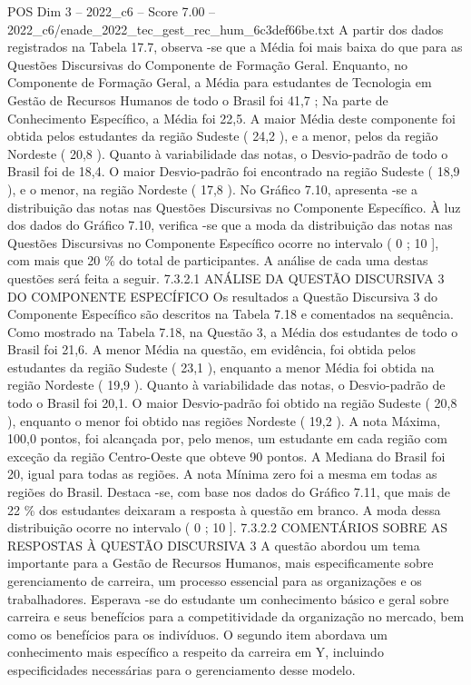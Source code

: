 \begin{textsample}{POS Dim 3 – 2022\_c6 – Score 7.00 – 2022\_c6/enade\_2022\_tec\_gest\_rec\_hum\_6c3def66be.txt}
A partir dos dados registrados na Tabela 17.7, observa -se que a Média foi mais baixa do que para as Questões Discursivas do Componente de Formação Geral.
Enquanto, no Componente de Formação Geral, a Média para estudantes de Tecnologia em Gestão de Recursos Humanos de todo o Brasil foi 41,7 ; Na parte de Conhecimento Específico, a Média foi 22,5.
A maior Média deste componente foi obtida pelos estudantes da região Sudeste ( 24,2 ), e a menor, pelos da região Nordeste ( 20,8 ).
Quanto à variabilidade das notas, o Desvio-padrão de todo o Brasil foi de 18,4.
O maior Desvio-padrão foi encontrado na região Sudeste ( 18,9 ), e o menor, na região Nordeste ( 17,8 ).
No Gráfico 7.10, apresenta -se a distribuição das notas nas Questões Discursivas no Componente Específico.
À luz dos dados do Gráfico 7.10, verifica -se que a moda da distribuição das notas nas Questões Discursivas no Componente Específico ocorre no intervalo ( 0 ; 10 ], com mais que 20 \% do total de participantes.
A análise de cada uma destas questões será feita a seguir. 7.3.2.1 ANÁLISE DA QUESTÃO DISCURSIVA 3 DO COMPONENTE ESPECÍFICO Os resultados a Questão Discursiva 3 do Componente Específico são descritos na Tabela 7.18 e comentados na sequência.
Como mostrado na Tabela 7.18, na Questão 3, a Média dos estudantes de todo o Brasil foi 21,6.
A menor Média na questão, em evidência, foi obtida pelos estudantes da região Sudeste ( 23,1 ), enquanto a menor Média foi obtida na região Nordeste ( 19,9 ).
Quanto à variabilidade das notas, o Desvio-padrão de todo o Brasil foi 20,1.
O maior Desvio-padrão foi obtido na região Sudeste ( 20,8 ), enquanto o menor foi obtido nas regiões Nordeste ( 19,2 ).
A nota Máxima, 100,0 pontos, foi alcançada por, pelo menos, um estudante em cada região com exceção da região Centro-Oeste que obteve 90 pontos.
A Mediana do Brasil foi 20, igual para todas as regiões.
A nota Mínima zero foi a mesma em todas as regiões do Brasil.
Destaca -se, com base nos dados do Gráfico 7.11, que mais de 22 \% dos estudantes deixaram a resposta à questão em branco.
A moda dessa distribuição ocorre no intervalo ( 0 ; 10 ]. 7.3.2.2 COMENTÁRIOS SOBRE AS RESPOSTAS À QUESTÃO DISCURSIVA 3 A questão abordou um tema importante para a Gestão de Recursos Humanos, mais especificamente sobre gerenciamento de carreira, um processo essencial para as organizações e os trabalhadores.
Esperava -se do estudante um conhecimento básico e geral sobre carreira e seus benefícios para a competitividade da organização no mercado, bem como os benefícios para os indivíduos.
O segundo item abordava um conhecimento mais específico a respeito da carreira em Y, incluindo especificidades necessárias para o gerenciamento desse modelo.

\end{textsample}
